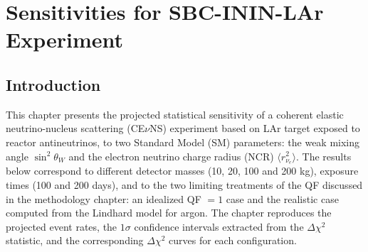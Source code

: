 \chapter{Sensitivities for SBC-ININ-LAr Experiment}\label{cap:analisis}
\label{chap:sensitivity_sin2thetaW_NCR}

\section{Introduction}
This chapter presents the projected statistical sensitivity of a coherent elastic neutrino-nucleus scattering (CE$\nu$NS) experiment based on LAr target exposed to reactor antineutrinos, to two Standard Model (SM) parameters: the weak mixing angle $\sin^2\theta_W$ and the electron neutrino charge radius (NCR) $\langle r_{\nu_e}^2\rangle$. The results below correspond to different detector masses (10, 20, 100 and 200 kg), exposure times (100 and 200 days), and to the two limiting treatments of the QF discussed in the methodology chapter: an idealized QF $=1$ case and the realistic case computed from the Lindhard model for argon. The chapter reproduces the projected event rates, the $1\sigma$ confidence intervals extracted from the $\Delta\chi^2$ statistic, and the corresponding $\Delta\chi^2$ curves for each configuration.
